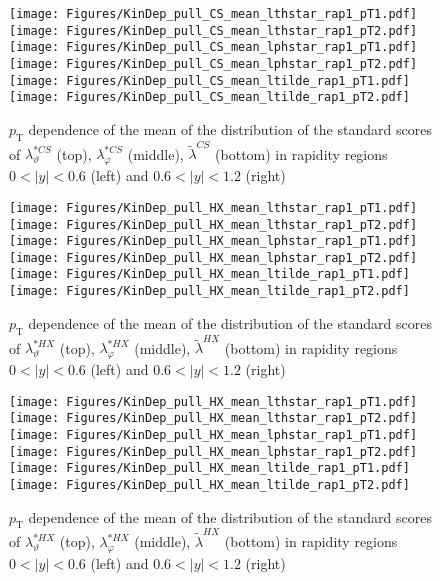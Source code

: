 \documentclass[12pt]{article}
\newcommand{\pT}{p_\mathrm{T}}
\newcommand{\absy}{\left |  y \right |}
\newcommand{\lamtildeCS}{\tilde{\lambda}^{\scriptscriptstyle CS}}
\newcommand{\lamthstarCS}{\lambda^{* \scriptscriptstyle CS}_\vartheta}
\newcommand{\lamphstarCS}{\lambda^{* \scriptscriptstyle CS}_\varphi}
\newcommand{\lamtildeHX}{\tilde{\lambda}^{\scriptscriptstyle HX}}
\newcommand{\lamthstarHX}{\lambda^{* \scriptscriptstyle HX}_\vartheta}
\newcommand{\lamphstarHX}{\lambda^{* \scriptscriptstyle HX}_\varphi}
\begin{document}
\begin{figure}[htbp]
\centering
\texttt{[image: Figures/KinDep\_pull\_CS\_mean\_lthstar\_rap1\_pT1.pdf]}
\texttt{[image: Figures/KinDep\_pull\_CS\_mean\_lthstar\_rap1\_pT2.pdf]}
\texttt{[image: Figures/KinDep\_pull\_CS\_mean\_lphstar\_rap1\_pT1.pdf]}
\texttt{[image: Figures/KinDep\_pull\_CS\_mean\_lphstar\_rap1\_pT2.pdf]}
\texttt{[image: Figures/KinDep\_pull\_CS\_mean\_ltilde\_rap1\_pT1.pdf]}
\texttt{[image: Figures/KinDep\_pull\_CS\_mean\_ltilde\_rap1\_pT2.pdf]}
\caption{$\pT$ dependence of the mean of the distribution of the standard scores
of $\lamthstarCS$ (top), $\lamphstarCS$ (middle), $\lamtildeCS$ (bottom) in
rapidity regions $0<\absy<0.6$ (left) and $0.6<\absy<1.2$ (right)}
\end{figure}
\clearpage




\begin{figure}[htbp]
\centering
\texttt{[image: Figures/KinDep\_pull\_HX\_mean\_lthstar\_rap1\_pT1.pdf]}
\texttt{[image: Figures/KinDep\_pull\_HX\_mean\_lthstar\_rap1\_pT2.pdf]}
\texttt{[image: Figures/KinDep\_pull\_HX\_mean\_lphstar\_rap1\_pT1.pdf]}
\texttt{[image: Figures/KinDep\_pull\_HX\_mean\_lphstar\_rap1\_pT2.pdf]}
\texttt{[image: Figures/KinDep\_pull\_HX\_mean\_ltilde\_rap1\_pT1.pdf]}
\texttt{[image: Figures/KinDep\_pull\_HX\_mean\_ltilde\_rap1\_pT2.pdf]}
\caption{$\pT$ dependence of the mean of the distribution of the standard scores
of $\lamthstarHX$ (top), $\lamphstarHX$ (middle), $\lamtildeHX$ (bottom) in
rapidity regions $0<\absy<0.6$ (left) and $0.6<\absy<1.2$ (right)}
\end{figure}
\clearpage


\begin{figure}[htbp]
\centering
\texttt{[image: Figures/KinDep\_pull\_HX\_mean\_lthstar\_rap1\_pT1.pdf]}
\texttt{[image: Figures/KinDep\_pull\_HX\_mean\_lthstar\_rap1\_pT2.pdf]}
\texttt{[image: Figures/KinDep\_pull\_HX\_mean\_lphstar\_rap1\_pT1.pdf]}
\texttt{[image: Figures/KinDep\_pull\_HX\_mean\_lphstar\_rap1\_pT2.pdf]}
\texttt{[image: Figures/KinDep\_pull\_HX\_mean\_ltilde\_rap1\_pT1.pdf]}
\texttt{[image: Figures/KinDep\_pull\_HX\_mean\_ltilde\_rap1\_pT2.pdf]}
\caption{$\pT$ dependence of the mean of the distribution of the standard scores
of $\lamthstarHX$ (top), $\lamphstarHX$ (middle), $\lamtildeHX$ (bottom) in
rapidity regions $0<\absy<0.6$ (left) and $0.6<\absy<1.2$ (right)}
\end{figure}
\clearpage
\end{document}
